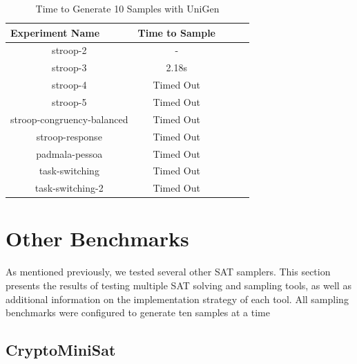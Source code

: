 \begin{table}[htb]
  \centering
  \caption{Time to Generate 10 Samples with UniGen}
\begin{tabular}{|c|c|c|c|c|}
\hline
\multicolumn{1}{|l|}{Experiment Name} & Time to Sample  \\ \hline
stroop-2                              & -               \\ \hline
stroop-3                              & 2.18s           \\ \hline
stroop-4                              & Timed Out       \\ \hline
stroop-5                              & Timed Out       \\ \hline
stroop-congruency-balanced            & Timed Out       \\ \hline
stroop-response                       & Timed Out       \\ \hline
padmala-pessoa                        & Timed Out       \\ \hline
task-switching                        & Timed Out       \\ \hline
task-switching-2                      & Timed Out       \\ \hline
\end{tabular}
\label{tab:benchmark_experiments_unigen}
\end{table}


\section{Other Benchmarks}

As mentioned previously, we tested several other SAT samplers. This section presents the results of testing multiple SAT solving and sampling tools, as well as additional information on the implementation strategy of each tool. All sampling benchmarks were configured to generate ten samples at a time

\subsection{CryptoMiniSat}

